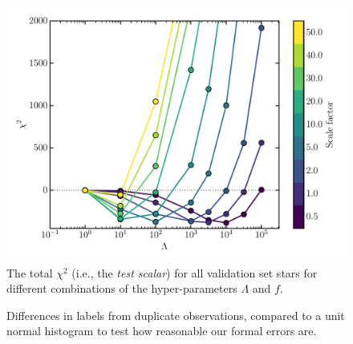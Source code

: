 \documentclass[12pt,preprint]{aastex}
\begin{document}
\begin{figure}[p]
\centering
\includegraphics[width=\textwidth]{validation-scalar.pdf}
\caption{The total $\chi^2$ (i.e., the \emph{test scalar}) for all validation set stars for different combinations of the hyper-parameters $\Lambda$ and $f$.
 \label{fig:gridsearch-test-scalar}}
\end{figure}




\begin{figure}[p]
\centering
\caption{Differences in labels from duplicate observations, compared to a unit normal histogram to test how reasonable our formal errors are.
\label{fig:duplicate-observations}}
\end{figure}
\end{document}
